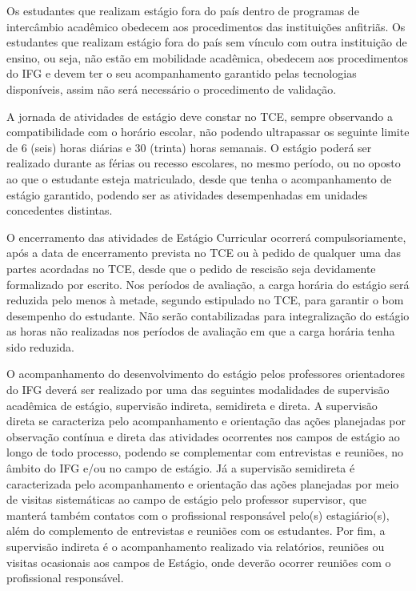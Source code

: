 \documentclass[11pt,fleqn]{book} %
\begin{document}
Os estudantes que realizam estágio fora do país dentro de programas de intercâmbio acadêmico obedecem aos procedimentos das instituições anfitriãs. 
Os estudantes que realizam estágio fora do país sem vínculo com outra instituição de ensino, ou seja, não estão em mobilidade acadêmica, obedecem aos procedimentos do IFG e devem ter o seu acompanhamento garantido pelas tecnologias disponíveis, assim não será necessário o procedimento de validação.

A jornada de atividades de estágio deve constar no TCE, sempre observando a compatibilidade com o horário escolar, não podendo ultrapassar os seguinte limite de 6 (seis) horas diárias e 30 (trinta) horas semanais. 
O estágio poderá ser realizado durante as férias ou recesso escolares, no mesmo período, ou no oposto ao que o estudante esteja matriculado, desde que tenha o acompanhamento de estágio garantido, podendo ser as atividades desempenhadas em unidades concedentes distintas.

O encerramento das atividades de Estágio Curricular ocorrerá compulsoriamente, após a data de encerramento prevista no TCE ou à pedido de qualquer uma das partes acordadas no TCE, desde que o pedido de rescisão seja devidamente formalizado por escrito.
Nos períodos de avaliação, a carga horária do estágio será reduzida pelo menos à metade, segundo estipulado no TCE, para garantir o bom desempenho do estudante. 
Não serão contabilizadas para integralização do estágio as horas não realizadas nos períodos de avaliação em que a carga horária tenha sido reduzida.
  
O acompanhamento do desenvolvimento do estágio pelos professores orientadores do IFG deverá ser realizado por uma das seguintes modalidades de supervisão acadêmica de estágio, supervisão indireta, semidireta e direta. 
A supervisão direta se caracteriza pelo acompanhamento e orientação das ações planejadas por observação contínua e direta das atividades ocorrentes nos campos de estágio ao longo de todo processo, podendo se complementar com entrevistas e reuniões, no âmbito do IFG e/ou no campo de estágio. 
Já a supervisão semidireta é caracterizada pelo acompanhamento e orientação das ações planejadas por meio de visitas sistemáticas ao campo de estágio pelo professor supervisor, que manterá também contatos com o profissional responsável pelo(s) estagiário(s), além do complemento de entrevistas e reuniões com os estudantes. 
Por fim, a supervisão indireta é o acompanhamento realizado via relatórios, reuniões ou visitas ocasionais aos campos de Estágio, onde deverão ocorrer reuniões com o profissional responsável.  
\end{document}
